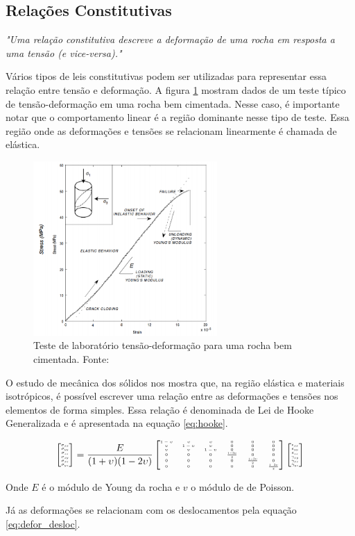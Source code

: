 \subsection{Relações Constitutivas}

\textit{"Uma relação constitutiva descreve a deformação de uma rocha em resposta a uma tensão (e vice-versa)."} \cite{ResGeomec}


Vários tipos de leis constitutivas podem ser utilizadas para representar essa relação entre tensão e deformação. A figura \ref{fig:stress_strain} mostram dados de um teste típico de tensão-deformação em uma rocha bem cimentada. Nesse caso, é importante notar que o comportamento linear é a região dominante nesse tipo de teste. Essa região onde as deformações e tensões se relacionam linearmente é chamada de elástica.


\begin{figure}[!htbp]
\label{fig:stress_strain}
\centering
\includegraphics[width=7cm]{chap01/stress_strain.PNG}
\caption{Teste de laboratório tensão-deformação para uma rocha bem cimentada. Fonte: \cite{ResGeomec}}
\end{figure}


O estudo de mecânica dos sólidos nos mostra que, na região elástica e materiais isotrópicos, é possível escrever uma relação entre as deformações e tensões nos elementos de forma simples. Essa relação é denominada de Lei de Hooke Generalizada e é apresentada na equação \ref{eq:hooke}.


\begin{equation}{
\label{eq:hooke}
\fontsize{4}{4}\selectfont
\stvetor = \elastic \evetor
}
\end{equation}

Onde $E$ é o módulo de Young da rocha e $v$ o módulo de de Poisson. 

Já as deformações se relacionam com os deslocamentos pela equação \ref{eq:defor_desloc}.

